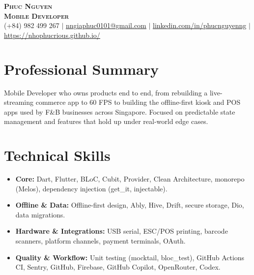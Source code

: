 \documentclass[10pt,a4paper]{article}
\begin{document}
\begin{center}
  \textbf{\Huge \scshape Phuc Nguyen} \\ \vspace{3pt}
  \textbf{\Large \scshape Mobile Developer} \\ \vspace{5pt}
  \small (+84) 982 499 267 $|$ \href{mailto:nngiaphuc0101@gmail.com}{\underline{nngiaphuc0101@gmail.com}} $|$ 
  \href{https://linkedin.com/in/phucnguyenng}{\underline{linkedin.com/in/phucnguyenng}} $|$
  \href{https://nhophucrious.github.io/}{\underline{https://nhophucrious.github.io/}}
\end{center}

\section{Professional Summary}
Mobile Developer who owns products end to end, from rebuilding a live-streaming commerce app to 60 FPS to building the offline-first kiosk and POS apps used by F\&B businesses across Singapore. Focused on predictable state management and features that hold up under real-world edge cases.
\vspace{-10pt}

\section{Technical Skills}
\begin{itemize}[leftmargin=0.15in, label={}, noitemsep]
    \item \textbf{Core:} Dart, Flutter, BLoC, Cubit, Provider, Clean Architecture, monorepo (Melos), dependency injection (get\_it, injectable).
    \item \textbf{Offline \& Data:} Offline-first design, Ably, Hive, Drift, secure storage, Dio, data migrations.
    \item \textbf{Hardware \& Integrations:} USB serial, ESC/POS printing, barcode scanners, platform channels, payment terminals, OAuth.
    \item \textbf{Quality \& Workflow:} Unit testing (mocktail, bloc\_test), GitHub Actions CI, Sentry, GitHub, Firebase, GitHub Copilot, OpenRouter, Codex.
\end{itemize}
\vspace{-20pt}
\end{document}
